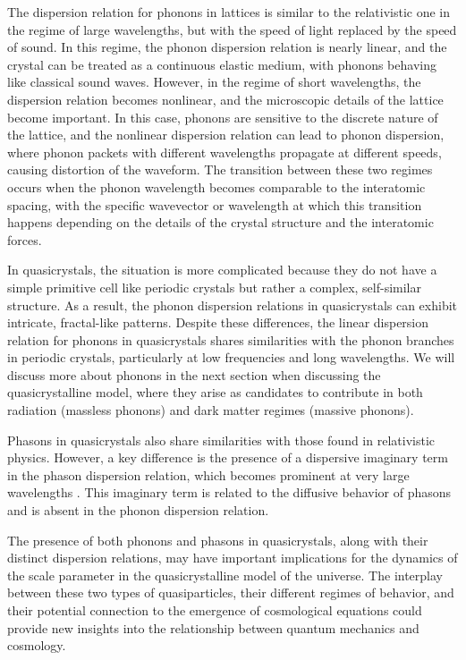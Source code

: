 \documentclass{article}
\begin{document}
The dispersion relation for phonons in lattices is similar to the relativistic one in the regime of large wavelengths, but with the speed of light replaced by the speed of sound. In this regime, the phonon dispersion relation is nearly linear, and the crystal can be treated as a continuous elastic medium, with phonons behaving like classical sound waves. However, in the regime of short wavelengths, the dispersion relation becomes nonlinear, and the microscopic details of the lattice become important. In this case, phonons are sensitive to the discrete nature of the lattice, and the nonlinear dispersion relation can lead to phonon dispersion, where phonon packets with different wavelengths propagate at different speeds, causing distortion of the waveform. The transition between these two regimes occurs when the phonon wavelength becomes comparable to the interatomic spacing, with the specific wavevector or wavelength at which this transition happens depending on the details of the crystal structure and the interatomic forces.

In quasicrystals, the situation is more complicated because they do not have a simple primitive cell like periodic crystals but rather a complex, self-similar structure. As a result, the phonon dispersion relations in quasicrystals can exhibit intricate, fractal-like patterns. Despite these differences, the linear dispersion relation for phonons in quasicrystals shares similarities with the phonon branches in periodic crystals, particularly at low frequencies and long wavelengths. We will discuss more about phonons in the next section when discussing the quasicrystalline model, where they arise as candidates to contribute in both radiation (massless phonons) and dark matter regimes (massive phonons).

Phasons in quasicrystals also share similarities with those found in relativistic physics. However, a key difference is the presence of a dispersive imaginary term in the phason dispersion relation, which becomes prominent at very large wavelengths \cite{Baggioli:2020haa,Lubensky}. This imaginary term is related to the diffusive behavior of phasons and is absent in the phonon dispersion relation.

The presence of both phonons and phasons in quasicrystals, along with their distinct dispersion relations, may have important implications for the dynamics of the scale parameter in the quasicrystalline model of the universe. The interplay between these two types of quasiparticles, their different regimes of behavior, and their potential connection to the emergence of cosmological equations could provide new insights into the relationship between quantum mechanics and cosmology.
\end{document}
